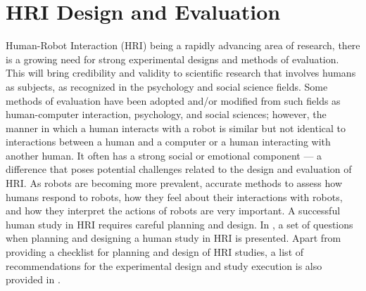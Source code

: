 {\section{HRI Design and Evaluation} %
Human-Robot Interaction (HRI) being a rapidly advancing area of research, there is a growing need for strong experimental designs and methods of evaluation. This will bring credibility and validity to scientific research that involves humans as subjects, as recognized in the psychology and social science fields. Some methods of evaluation have been adopted and/or modified from such fields as human-computer interaction, psychology, and social sciences; however, the manner in which a human interacts with a robot is similar but not identical to interactions between a human and a computer or a human interacting with another human. It often has a strong social or emotional component — a difference that poses potential challenges related to the design and evaluation of HRI. As robots are becoming more prevalent, accurate methods to assess how humans respond to robots, how they feel about their interactions with robots, and how they interpret the actions of robots are very important. 
A successful human study in HRI requires careful planning and design. In \cite{bethel2010review}, a set of questions when planning and designing a human study in HRI is presented. Apart from providing a checklist for planning and design of HRI studies, a list of recommendations for the experimental design and study execution is also provided in \cite{bethel2010review}.
	
}
